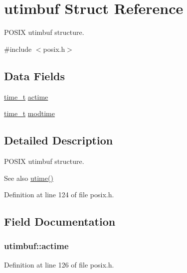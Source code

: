\hypertarget{structutimbuf}{}\section{utimbuf Struct Reference}
\label{structutimbuf}


P\+O\+S\+IX utimbuf structure.  




{\ttfamily \#include $<$posix.\+h$>$}

\subsection*{Data Fields}
\begin{DoxyCompactItemize}
\item 
\hyperlink{time_8h_a3346b04b0420b32ccf6b706551b70762}{time\+\_\+t} \hyperlink{structutimbuf_aa39cf0bad7eff4df6239528506a557df}{actime}
\item 
\hyperlink{time_8h_a3346b04b0420b32ccf6b706551b70762}{time\+\_\+t} \hyperlink{structutimbuf_a7588ffe699a9eda52e94aa593bf7d6d8}{modtime}
\end{DoxyCompactItemize}


\subsection{Detailed Description}
P\+O\+S\+IX utimbuf structure. 

\begin{DoxySeeAlso}{See also}
\hyperlink{posix_8c_a732642e09075838bbbca28b3529f13db}{utime()} 
\end{DoxySeeAlso}


Definition at line 124 of file posix.\+h.



\subsection{Field Documentation}
\subsubsection[{\texorpdfstring{actime}{actime}}]{ utimbuf\+::actime}\hypertarget{structutimbuf_aa39cf0bad7eff4df6239528506a557df}{}\label{structutimbuf_aa39cf0bad7eff4df6239528506a557df}


Definition at line 126 of file posix.\+h.

